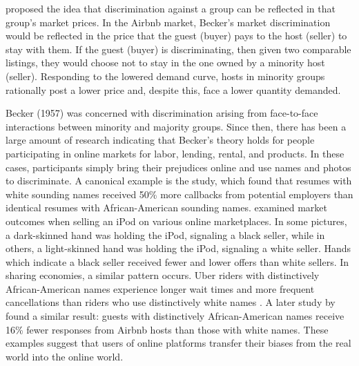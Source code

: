 \cite{becker} proposed the idea that discrimination against a group can be reflected in that group's market prices. In the Airbnb market, Becker's market discrimination would be reflected in the price that the guest (buyer) pays to the host (seller) to stay with them. If the guest (buyer) is discriminating, then given two comparable listings, they would choose not to stay in the one owned by a minority host (seller). Responding to the lowered demand curve, hosts in minority groups rationally post a lower price and, despite this, face a lower quantity demanded. 

Becker (1957) was concerned with discrimination arising from face-to-face interactions between minority and majority groups. Since then, there has been a large amount of research indicating that Becker's theory holds for people participating in online markets for labor, lending, rental, and products. In these cases, participants simply bring their prejudices online and use names and photos to discriminate. A canonical example is the \cite{bertrand} study, which found that resumes with white sounding names received 50\% more callbacks from potential employers than identical resumes with African-American sounding names. \cite{doleac} examined market outcomes when selling an iPod on various online marketplaces. In some pictures, a dark-skinned hand was holding the iPod, signaling a black seller, while in others, a light-skinned hand was holding the iPod, signaling a white seller. Hands which indicate a black seller received fewer and lower offers than white sellers. In sharing economies, a similar pattern occurs. Uber riders with distinctively African-American names experience longer wait times and more frequent cancellations than riders who use distinctively white names \citep{knittel}. A later study by \cite{edelman2} found a similar result: guests with distinctively African-American names receive 16\% fewer responses from Airbnb hosts than those with white names. These examples suggest that users of online platforms transfer their biases from the real world into the online world.  

